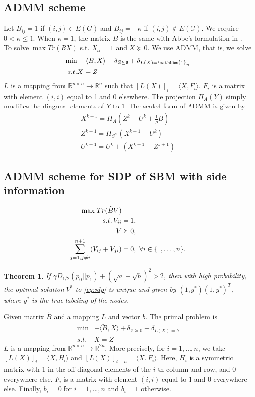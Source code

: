 \documentclass{article}
\newtheorem{theorem}{Theorem}
\begin{document}
\subsection{ADMM scheme}
Let $B_{ij} = 1$ if $(i,j) \in E(G)$ and $B_{ij} = -\kappa$ if $(i,j) \not \in E(G)$.
We require $0<\kappa \leq 1$. When $\kappa = 1$, the matrix $B$ is the same with
Abbe's formulation in \cite{abbe2015exact}.
To solve $\max Tr(BX)$ s.t. $X_{ii} = 1$ and $X \succeq 0$.
We use ADMM, that is, we solve
\begin{align*}
\min & - \langle B, X\rangle + \delta_{Z \succeq 0} + \delta_{L(X) = \mathbbm{1}_n}\\
s.t.& X=Z
\end{align*}
$L$ is a mapping from $\mathbb{R}^{n \times n} \to \mathbb{R}^n$ such that $[L(X)]_i =  \langle X,F_i \rangle $.
$F_i$ is a matrix with element $(i,i)$ equal to 1 and 0 elsewhere.
The projection $\Pi_{A}(Y)$ simply modifies the diagonal elements of $Y$ to $1$.
The scaled form of ADMM \cite{boyd2011distributed} is given by
\begin{align}
X^{k+1} = \Pi_A(Z^k - U^k + \frac{1}{\rho}B)\label{eq:admm} \\
Z^{k+1} = \Pi_{S_+^n}(X^{k+1} + U^{k}) \\
U^{k+1} = U^k + (X^{k+1} - Z^{k+1}) 
\end{align}
\subsection{ADMM scheme for SDP of SBM with side information}
\begin{align}
\max\, Tr(\tilde{B}V)  &\notag\\
s.t.\, V_{ii} &= 1, \notag\\
V &\succeq 0, \notag\\
\sum_{j=1,j\neq i}^{n+1} (V_{ij} + V_{ji})& = 0,~\forall i\in\{1,\ldots,n\}. \label{eq:sdp}
\end{align}

\begin{theorem}\label{thm:sdp}
	If $\gamma D_{1/2}(p_0||p_1)  + (\sqrt{a} - \sqrt{b})^2 > 2$, then with high probability, the optimal solution
	$V^*$ to \eqref{eq:sdp} is unique and given by $(1,y^*)(1,y^*)^T$, where $y^*$ is the true labeling of the nodes.
\end{theorem}

Given matrix $\widetilde{B}$ and a mapping $L$ and vector $b$. The primal
problem is
\begin{align*}
\min & - \langle \widetilde{B}, X\rangle + \delta_{Z \succeq 0} + \delta_{L(X) = b}\\
s.t.& X=Z
\end{align*}
$L$ is a mapping from $\mathbb{R}^{n \times n} \to \mathbb{R}^{2n}$.
More precisely, for $i=1,\dots,n$, we  take
$[L(X)]_i = \langle X,H_i \rangle$ and $[L(X)]_{i+n} = \langle X,F_i \rangle$. Here,
$H_i$ is a symmetric matrix with 1 in the off-diagonal elements of the
$i$-th column and row, and 0 everywhere else.  $F_i$ is a matrix with
element $(i,i)$ equal to 1 and 0 everywhere else. Finally, $b_i = 0$ for $i=1,\dots,n$ and $b_i = 1$ otherwise. 
\end{document}
